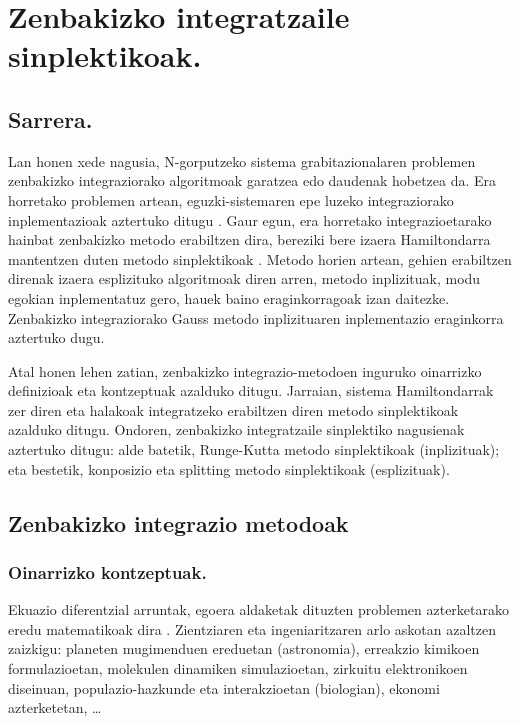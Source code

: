 \chapter{Zenbakizko integratzaile sinplektikoak.}

\section{Sarrera.}

Lan honen xede nagusia, N-gorputzeko sistema grabitazionalaren problemen zenbakizko integraziorako algoritmoak garatzea edo daudenak hobetzea da. Era horretako problemen artean, eguzki-sistemaren epe luzeko integraziorako inplementazioak aztertuko ditugu \cite{Kholshevnikov2007,Brumberg2013} . Gaur egun, era horretako integrazioetarako hainbat zenbakizko metodo erabiltzen dira, bereziki bere izaera Hamiltondarra mantentzen duten metodo sinplektikoak \cite{Eggl2010,Saha1992,Farres2013}. Metodo horien artean, gehien erabiltzen direnak izaera esplizituko algoritmoak diren arren, metodo inplizituak, modu egokian inplementatuz gero, hauek baino eraginkorragoak izan daitezke. Zenbakizko integraziorako Gauss metodo inplizituaren inplementazio eraginkorra aztertuko dugu.   

Atal honen lehen zatian, zenbakizko integrazio-metodoen inguruko oinarrizko definizioak eta kontzeptuak azalduko ditugu. 
Jarraian, sistema Hamiltondarrak zer diren eta halakoak integratzeko erabiltzen diren metodo sinplektikoak azalduko ditugu. Ondoren, zenbakizko integratzaile sinplektiko nagusienak aztertuko ditugu: alde batetik, Runge-Kutta metodo sinplektikoak (inplizituak); eta bestetik, konposizio eta splitting metodo sinplektikoak (esplizituak).

\section{Zenbakizko integrazio metodoak}

\subsection{Oinarrizko kontzeptuak.}

Ekuazio diferentzial arruntak, egoera aldaketak dituzten problemen azterketarako eredu matematikoak dira \cite{Hairer2015}. Zientziaren eta ingeniaritzaren arlo askotan azaltzen zaizkigu: planeten mugimenduen ereduetan (astronomia), erreakzio kimikoen formulazioetan, molekulen dinamiken simulazioetan, zirkuitu elektronikoen diseinuan, populazio-hazkunde eta interakzioetan (biologian), ekonomi azterketetan, \ldots  

